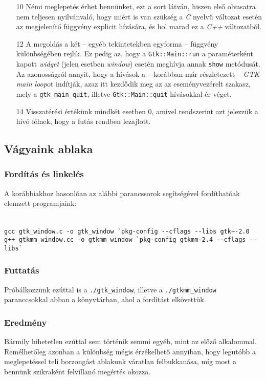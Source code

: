 \begin{enumerate}
 \item[10] Némi meglepetés érhet bennünket, ezt a sort látván, hiszen első olvasatra nem teljesen nyilvánvaló, hogy miért is van szükség a \textit{C} nyelvű változat esetén az megjelenítő függvény explicit hívására, és hol marad ez a \textit{C++} változatból.

 \item[12] A megoldás a két -- egyéb tekintetekben egyforma -- függvény különbségében rejlik. Ez pedig az, hogy a \texttt{Gtk::Main::run} a paraméterként kapott \textit{widget} (jelen esetben \textit{window}) esetén meghívja annak \texttt{show} metódusát. Az azonosságról annyit, hogy a hívások a -- korábban már részletezett -- \textit{GTK main loop}ot indítják, azaz itt kezdődik meg az az eseményvezérelt szakasz, mely a \texttt{gtk\_main\_quit}, illetve \texttt{Gtk::Main::quit} hívásokkal ér véget.

 \item[14] Visszatérési értékünk mindkét esetben 0, amivel rendszerint azt jelezzük a hívó félnek, hogy a futás rendben lezajlott.
\end{enumerate}

\subsection{Vágyaink ablaka}

\subsubsection{Fordítás és linkelés}

A korábbiakhoz hasonlóan az alábbi parancssorok segítségével fordíthatóak e\-lem\-zett programjaink:

\fontsize{8pt}{8pt}
\ \\
\texttt{gcc gtk\_window.c -o gtk\_window \`{}pkg-config {-}-cflags {-}-libs gtk+-2.0}
\ \\
\texttt{g++ gtkmm\_window.cc -o gtkmm\_window \`{}pkg-config gtkmm-2.4 {-}-cflags {-}-libs\`{}}

\subsubsection{Futtatás}

Próbálkozzunk ezúttal is a \texttt{./gtk\_window}, illetve a \texttt{./gtkmm\_window} paranccsokkal abban a könyvtárban, ahol a fordítást elkövettük.

\subsubsection{Eredmény}

Bármily hihetetlen ezúttal sem történik semmi egyéb, mint az előző alkalommal. Remélhetőleg azonban a különbség mégis érzékelhető annyiban, hogy legutóbb a meglepetéssel teli borzongást ablakunk váratlan felbukkanása, míg most a bennünk szikraként felvillanó megértés okozza.
